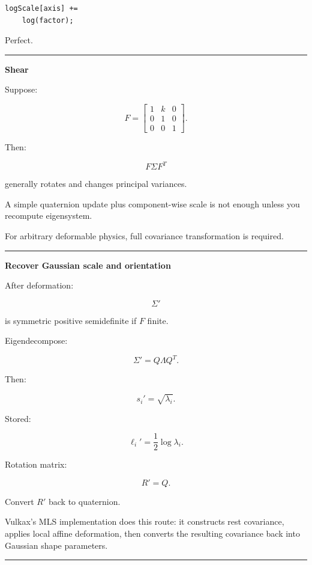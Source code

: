 \begin{verbatim}
logScale[axis] +=
    log(factor);
\end{verbatim}

Perfect.

\begin{center}\rule{0.5\linewidth}{0.5pt}\end{center}

\textbf{Shear}

Suppose:

\[
F=
\begin{bmatrix}
1&k&0\\
0&1&0\\
0&0&1
\end{bmatrix}.
\]

Then:

\[
F\Sigma F^T
\]

generally rotates and changes principal variances.

A simple quaternion update plus component-wise scale is not enough unless you recompute eigensystem.

For arbitrary deformable physics, full covariance transformation is required.

\begin{center}\rule{0.5\linewidth}{0.5pt}\end{center}

\textbf{Recover Gaussian scale and orientation}

After deformation:

\[
\Sigma'
\]

is symmetric positive semidefinite if \(F\) finite.

Eigendecompose:

\[
\Sigma'
=
Q\Lambda Q^T.
\]

Then:

\[
s_i'=
\sqrt{\lambda_i}.
\]

Stored:

\[
\boxed{
\ell_i'
=
\frac12
\log\lambda_i.
}
\]

Rotation matrix:

\[
R'=Q.
\]

Convert \(R'\) back to quaternion.

Vulkax's MLS implementation does this route: it constructs rest covariance, applies local affine deformation, then converts the resulting covariance back into Gaussian shape parameters.

\begin{center}\rule{0.5\linewidth}{0.5pt}\end{center}

